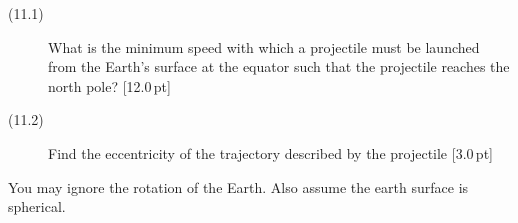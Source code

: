 \begin{description}
\item[(11.1)] What is the minimum speed with which a projectile must be
  launched from the Earth's surface at the equator such that the projectile
  reaches the north pole? \hfill[12.0\,pt]
\item[(11.2)] Find the eccentricity of the trajectory described by the
  projectile \hfill[3.0\,pt]
\end{description}

You may ignore the rotation of the Earth. Also assume the earth surface is
spherical.
